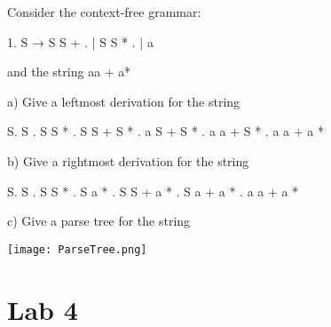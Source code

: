 \documentclass[letterpaper, 10pt,DIV=13]{scrartcl}
\numberwithin{equation}{section} %
\numberwithin{figure}{section} %
\numberwithin{table}{section} %
\begin{document}
Consider the context-free grammar: \newline

    1. S → S S + .   | S S * .   | a    \newline

and the string aa + a* \newline

\newpage

a) Give a leftmost derivation for the string \newline

    S. S . S S * . S S + S * . a S + S * . a a + S * . a a + a * \newline
    


    
b) Give a rightmost derivation for the string \newline

    S. S . S S * . S a * . S S + a * . S a + a * . a a + a * \newline

    
c) Give a parse tree for the string \newline

    \begin{center}
        \texttt{[image: ParseTree.png]}
    \end{center}   


\pagebreak


\section*{Lab 4}
\end{document}

